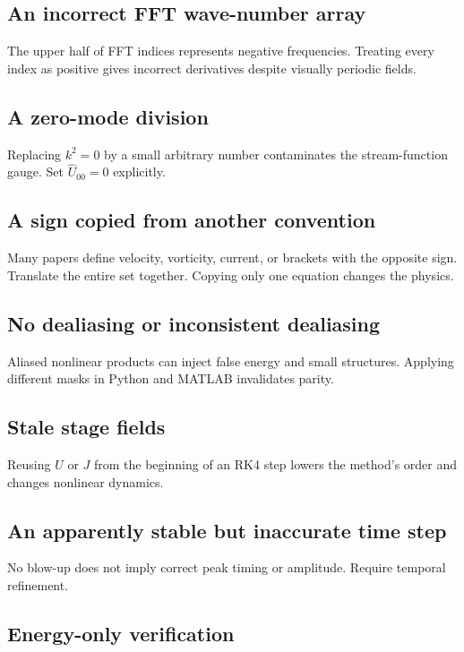 \documentclass[11pt]{article}
\begin{document}
\subsection{An incorrect FFT wave-number array}

The upper half of FFT indices represents negative frequencies. Treating every index as positive gives incorrect derivatives despite visually periodic fields.

\subsection{A zero-mode division}

Replacing $k^2=0$ by a small arbitrary number contaminates the stream-function gauge. Set $\widehat U_{00}=0$ explicitly.

\subsection{A sign copied from another convention}

Many papers define velocity, vorticity, current, or brackets with the opposite sign. Translate the entire set together. Copying only one equation changes the physics.

\subsection{No dealiasing or inconsistent dealiasing}

Aliased nonlinear products can inject false energy and small structures. Applying different masks in Python and MATLAB invalidates parity.

\subsection{Stale stage fields}

Reusing $U$ or $J$ from the beginning of an RK4 step lowers the method's order and changes nonlinear dynamics.

\subsection{An apparently stable but inaccurate time step}

No blow-up does not imply correct peak timing or amplitude. Require temporal refinement.

\subsection{Energy-only verification}
\end{document}
